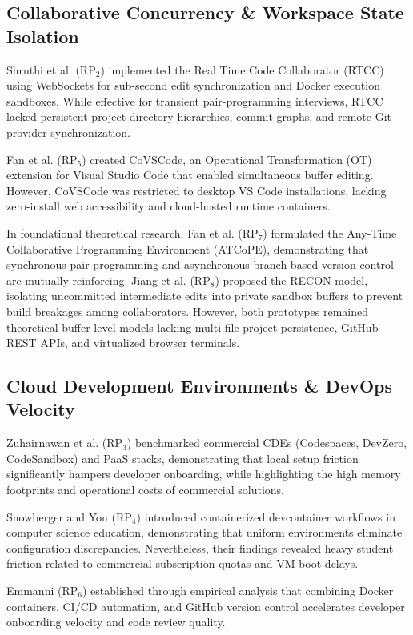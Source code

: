 \documentclass[conference]{IEEEtran}
\begin{document}
\subsection{Collaborative Concurrency \& Workspace State Isolation}
Shruthi et al. ($\text{RP}_2$) \cite{rp2} implemented the Real Time Code Collaborator (RTCC) using WebSockets for sub-second edit synchronization and Docker execution sandboxes. While effective for transient pair-programming interviews, RTCC lacked persistent project directory hierarchies, commit graphs, and remote Git provider synchronization.

Fan et al. ($\text{RP}_5$) \cite{rp5} created CoVSCode, an Operational Transformation (OT) extension for Visual Studio Code that enabled simultaneous buffer editing. However, CoVSCode was restricted to desktop VS Code installations, lacking zero-install web accessibility and cloud-hosted runtime containers.

In foundational theoretical research, Fan et al. ($\text{RP}_7$) \cite{rp7} formulated the Any-Time Collaborative Programming Environment (ATCoPE), demonstrating that synchronous pair programming and asynchronous branch-based version control are mutually reinforcing. Jiang et al. ($\text{RP}_8$) \cite{rp8} proposed the RECON model, isolating uncommitted intermediate edits into private sandbox buffers to prevent build breakages among collaborators. However, both prototypes remained theoretical buffer-level models lacking multi-file project persistence, GitHub REST APIs, and virtualized browser terminals.

\subsection{Cloud Development Environments \& DevOps Velocity}
Zuhairnawan et al. ($\text{RP}_3$) \cite{rp3} benchmarked commercial CDEs (Codespaces, DevZero, CodeSandbox) and PaaS stacks, demonstrating that local setup friction significantly hampers developer onboarding, while highlighting the high memory footprints and operational costs of commercial solutions.

Snowberger and You ($\text{RP}_4$) \cite{rp4} introduced containerized devcontainer workflows in computer science education, demonstrating that uniform environments eliminate configuration discrepancies. Nevertheless, their findings revealed heavy student friction related to commercial subscription quotas and VM boot delays.

Emmanni ($\text{RP}_6$) \cite{rp6} established through empirical analysis that combining Docker containers, CI/CD automation, and GitHub version control accelerates developer onboarding velocity and code review quality.
\end{document}
